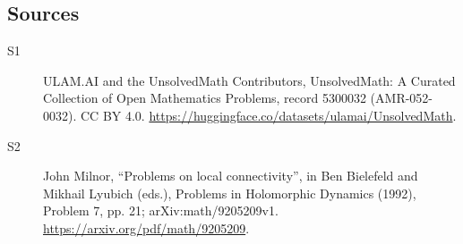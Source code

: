 \documentclass[11pt]{article}
\begin{document}
\subsection{Sources}
\begin{description}
\item[\hypertarget{source:5300032:1}{S1}] ULAM.AI and the UnsolvedMath Contributors, UnsolvedMath: A Curated Collection of Open Mathematics Problems, record 5300032 (AMR-052-0032). CC BY 4.0. \url{https://huggingface.co/datasets/ulamai/UnsolvedMath}.
\item[\hypertarget{source:5300032:2}{S2}] John Milnor, ``Problems on local connectivity'', in Ben Bielefeld and Mikhail Lyubich (eds.), Problems in Holomorphic Dynamics (1992), Problem 7, pp. 21; arXiv:math/9205209v1. \url{https://arxiv.org/pdf/math/9205209}.
\end{description}
\label{end:5300032}
\end{document}
